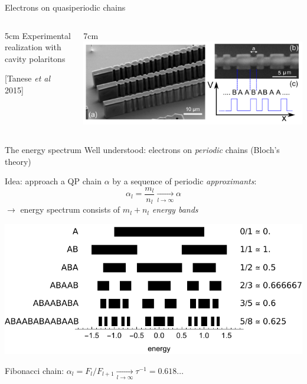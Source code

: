 \documentclass[xcolor=x11names,compress,professionalfonts]{beamer}
\renewcommand{\(}{\begin{columns}}
\renewcommand{\)}{\end{columns}}
\newcommand{\<}[1]{\begin{column}{#1}}
\renewcommand{\>}{\end{column}}
\begin{document}
\begin{frame}{Electrons on quasiperiodic chains}
\(
\<{5cm}
\flushright
Experimental realization with cavity polaritons

\small{[Tanese \textit{et al} 2015]}
\>

\<{7cm}
\centering
\includegraphics[scale=.15]{img/tanese.png}
\>
\)

\end{frame}

\begin{frame}{The energy spectrum}
Well understood: electrons on \emph{periodic} chains (Bloch's theory)

Idea: approach a QP chain $\alpha$ by a sequence of periodic \emph{approximants}:
\[
	\alpha_l = \frac{m_l}{n_l} \xrightarrow[l \to \infty]{} \alpha
\]
$\rightarrow$ energy spectrum consists of $m_l + n_l$ \emph{energy bands}

{\centering
\includegraphics[scale=.8]{img/energy_bands.pdf}

}

Fibonacci chain: $\alpha_l = F_{l}/F_{l+1} \xrightarrow[l \to \infty]{} \tau^{-1} = 0.618\dots$

\end{frame}
\end{document}
